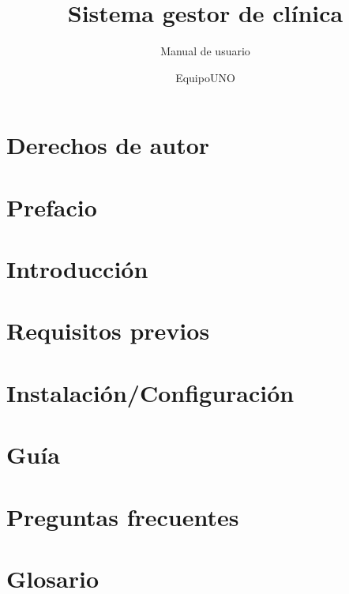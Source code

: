 \documentclass[oneside,10pt]{book}
\title{Sistema gestor de clínica}
\subtitle{Manual de usuario}
\author{EquipoUNO}
\begin{document}
\maketitle
\thispagestyle{empty}

\frontmatter
\tableofcontents

\mainmatter

\chapter{Derechos de autor}

\chapter{Prefacio}

\chapter{Introducción}


\chapter{Requisitos previos}


\chapter{Instalaci\'on/Configuraci\'on}

\chapter{Gu\'ia}

\chapter{Preguntas frecuentes}





\chapter{Glosario}

	
\end{document}
